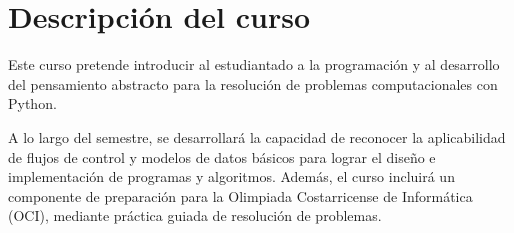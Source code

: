 \section{Descripción del curso}

Este curso pretende introducir al estudiantado a la programación y al desarrollo del pensamiento abstracto para la resolución de problemas computacionales con Python.

A lo largo del semestre, se desarrollará la capacidad de reconocer la aplicabilidad de flujos de control y modelos de datos básicos para lograr el diseño e implementación de programas y algoritmos.
Además, el curso incluirá un componente de preparación para la Olimpiada Costarricense de Informática (OCI), mediante práctica guiada de resolución de problemas.
